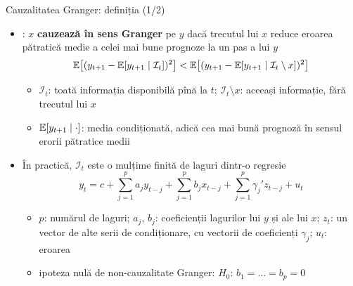 \begin{frame}{Cauzalitatea Granger: definiția (1/2)}
\itemsize{\small}
\begin{itemize}
    \item {}: $x$ \textbf{cauzează în sens Granger} pe $y$ dacă trecutul lui $x$ reduce eroarea pătratică medie a celei mai bune prognoze la un pas a lui $y$ \[ \mathbb{E}\big[(y_{t+1} - \mathbb{E}[y_{t+1}\mid \mathcal I_t])^2\big] < \mathbb{E}\big[(y_{t+1} - \mathbb{E}[y_{t+1}\mid \mathcal I_t\setminus x])^2\big] \]
    \begin{itemize}
        \item $\mathcal I_t$: toată informația disponibilă pînă la $t$; $\mathcal I_t\setminus x$: aceeași informație, fără trecutul lui $x$
        \item $\mathbb{E}[y_{t+1}\mid\cdot]$: media condiționată, adică cea mai bună prognoză în sensul erorii pătratice medii
    \end{itemize}
    \item În practică, $\mathcal I_t$ este o mulțime finită de laguri dintr-o regresie \[ y_t = c + \sum_{j=1}^p a_jy_{t-j} + \sum_{j=1}^p b_jx_{t-j} + \sum_{j=1}^p \gamma_j'z_{t-j} + u_t \]
    \begin{itemize}
        \item $p$: numărul de laguri; $a_j$, $b_j$: coeficienții lagurilor lui $y$ și ale lui $x$; $z_t$: un vector de alte serii de condiționare, cu vectorii de coeficienți $\gamma_j$; $u_t$: eroarea
        \item ipoteza nulă de non-cauzalitate Granger: $H_0$: $b_1 = \dots = b_p = 0$
    \end{itemize}
\end{itemize}
\end{frame}

